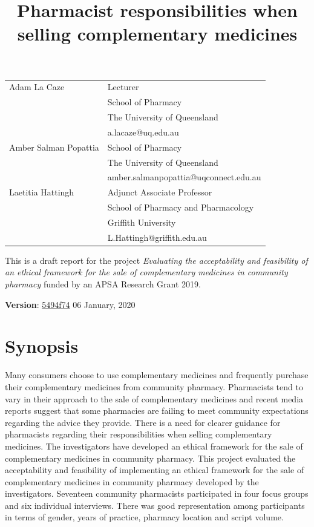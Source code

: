 \documentclass[11pt,a4paper]{article}
\title{Pharmacist responsibilities when selling complementary medicines}
\author{}
\date{}
\begin{document}
\maketitle

\begin{tabular}{ll} Adam La Caze & Lecturer\tabularnewline
& School of Pharmacy\tabularnewline
& The University of Queensland\tabularnewline
& a.lacaze@uq.edu.au\tabularnewline[10pt] Amber Salman Popattia & School of Pharmacy\tabularnewline
& The University of Queensland\tabularnewline
& amber.salmanpopattia@uqconnect.edu.au\tabularnewline[10pt] Laetitia Hattingh & Adjunct Associate Professor\tabularnewline
& School of Pharmacy and Pharmacology\tabularnewline
& Griffith University\tabularnewline
& L.Hattingh@griffith.edu.au\tabularnewline
\end{tabular}

\vfill
This is a draft report for the project \emph{Evaluating the
acceptability and feasibility of an ethical framework for the sale of
complementary medicines in community pharmacy} funded by an APSA
Research Grant 2019.

\bigskip
\textbf{Version}:
\href{https://github.com/alacaze/cmethics_apsa}{5494f74} \hfill 06
January, 2020

\newpage 

\tableofcontents

\newpage

\section{Synopsis}\label{synopsis}

Many consumers choose to use complementary medicines and frequently
purchase their complementary medicines from community pharmacy.
Pharmacists tend to vary in their approach to the sale of complementary
medicines and recent media reports suggest that some pharmacies are
failing to meet community expectations regarding the advice they
provide. There is a need for clearer guidance for pharmacists regarding
their responsibilities when selling complementary medicines. The
investigators have developed an ethical framework for the sale of
complementary medicines in community pharmacy. This project evaluated
the acceptability and feasibility of implementing an ethical framework
for the sale of complementary medicines in community pharmacy developed
by the investigators. Seventeen community pharmacists participated in
four focus groups and six individual interviews. There was good
representation among participants in terms of gender, years of practice,
pharmacy location and script volume.
\end{document}
